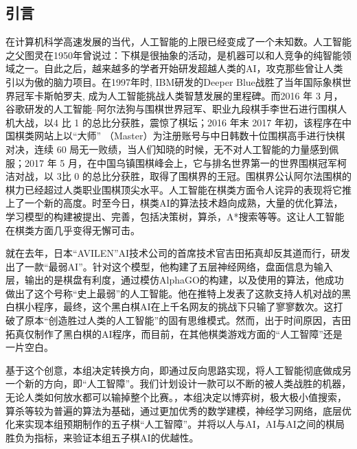 \documentclass[a4paper]{article}
\begin{document}
    \begin{multicols}{2}
    \section{引言}
    在计算机科学高速发展的当代，人工智能的上限已经变成了一个未知数。人工智能之父图灵在1950年曾说过：下棋是很抽象的活动，是机器可以和人竞争的纯智能领域之一。\cite{ref1}自此之后，越来越多的学者开始研发超越人类的AI，攻克那些曾让人类引以为傲的脑力项目。在1997年时, IBM研发的Deeper Blue战胜了当年国际象棋世界冠军卡斯帕罗夫, 成为人工智能挑战人类智慧发展的里程碑。而2016 年 3 月，谷歌研发的人工智能–阿尔法狗与围棋世界冠军、职业九段棋手李世石进行围棋人机大战，以4 比 1 的总比分获胜，震惊了棋坛；2016 年末 2017 年初，该程序在中国棋类网站上以“大师” （Master）为注册账号与中日韩数十位围棋高手进行快棋对决，连续 60 局无一败绩，当人们知晓的时候，无不对人工智能的力量感到佩服；2017 年 5 月，在中国乌镇围棋峰会上，它与排名世界第一的世界围棋冠军柯洁对战，以 3比 0 的总比分获胜，取得了围棋界的王冠。围棋界公认阿尔法围棋的棋力已经超过人类职业围棋顶尖水平。人工智能在棋类方面令人诧异的表现将它推上了一个新的高度。时至今日，棋类AI的算法技术趋向成熟，大量的优化算法，学习模型的构建被提出、完善，包括决策树，算杀，A*搜索等等。这让人工智能在棋类方面几乎变得无懈可击。\par
就在去年，日本“AVILEN”AI技术公司的首席技术官吉田拓真却反其道而行，研发出了一款“最弱AI”。针对这个模型，他构建了五层神经网络，盘面信息为输入层，输出的是棋盘有利度，通过模仿AlphaGO的构建，以及使用的算法，他成功做出了这个号称“史上最弱”的人工智能。他在推特上发表了这款支持人机对战的黑白棋小程序，最终，这个黑白棋AI在上千名网友的挑战下只输了寥寥数次。这打破了原本“创造胜过人类的人工智能”的固有思维模式。然而，出于时间原因，吉田拓真仅制作了黑白棋的AI程序\cite{ref2}，而目前，在其他棋类游戏方面的“人工智障”还是一片空白。\par
基于这个创意，本组决定转换方向，即通过反向思路实现，将人工智能彻底做成另一个新的方向，即“人工智障”。我们计划设计一款可以不断的被人类战胜的机器，无论人类如何放水都可以输掉整个比赛。，本组决定以博弈树，极大极小值搜索，算杀等较为普遍的算法为基础，通过更加优秀的数学建模，神经学习网络，底层优化来实现本组预期制作的五子棋“人工智障”。并将以人与AI，AI与AI之间的棋局胜负为指标，来验证本组五子棋AI的优越性。

\end{multicols}
\end{document}
